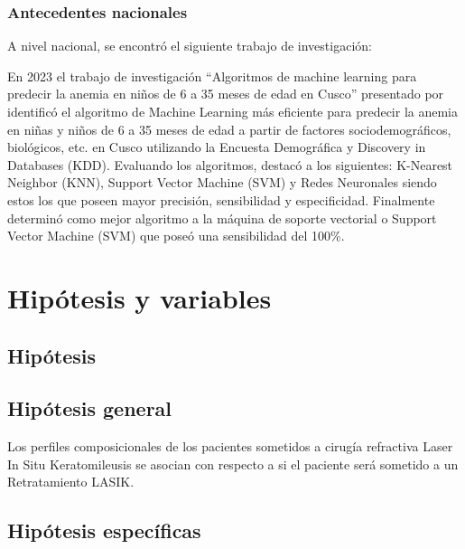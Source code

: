 \subsubsection{Antecedentes nacionales}
A nivel nacional, se encontró el siguiente trabajo de investigación:

En 2023 el trabajo de investigación ``Algoritmos de machine learning para predecir la anemia en niños de 6 a 35 meses de edad en Cusco'' presentado por \citep{mamani2023algoritmos} identificó el algoritmo de Machine Learning más eficiente para predecir la anemia en niñas y niños de 6 a 35 meses de edad a partir de factores sociodemográficos, biológicos, etc. en Cusco utilizando la Encuesta Demográfica y Discovery in Databases (KDD). Evaluando los algoritmos, destacó a los siguientes: K-Nearest Neighbor (KNN), Support Vector Machine (SVM) y Redes Neuronales siendo estos los que poseen mayor precisión, sensibilidad y especificidad. Finalmente determinó como mejor algoritmo a la máquina de soporte vectorial o Support Vector Machine (SVM) que poseó una sensibilidad del 100$\%$.




\section{Hipótesis y variables}



\subsection{Hipótesis}



\subsection{Hipótesis general}

Los perfiles composicionales de los pacientes sometidos a cirugía refractiva Laser In Situ Keratomileusis se asocian con respecto a si el paciente será sometido a un Retratamiento LASIK.

\subsection{Hipótesis específicas}

